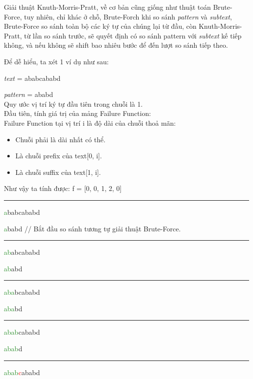 \documentclass[a4paper,11pt]{article}
\begin{document}
			Giải thuật Knuth-Morris-Pratt, về cơ bản cũng giống như thuật toán Brute-Force, 
			tuy nhiên, chỉ khác ở chỗ, Brute-Forch khi so sánh \textit{pattern} và \textit{subtext}, Brute-Force so sánh toàn bộ 
			các ký tự của chúng lại từ đầu, còn Knuth-Morris-Pratt, từ lần so sánh trước, sẽ quyết định có so sánh pattern với \textit{subtext} kế tiếp không, 
			và nếu không sẽ shift bao nhiêu bước để đến lượt so sánh tiếp theo.

			Để dễ hiểu, ta xét 1 ví dụ như sau: 
			
			\textit{text} \hspace*{6mm}= ababcababd

			\textit{pattern} \hspace*{0.3mm}= ababd\\
			Quy ước vị trí ký tự đầu tiên trong chuỗi là 1.\\
			Đầu tiên, tính giá trị của mảng Failure Function:\\
			Failure Function tại vị trí i là độ dài của chuỗi thoả mãn:
			\begin{itemize}
				\item Chuỗi phải là dài nhất có thể.
				\item Là chuỗi prefix của text[0, i].
				\item Là chuỗi suffix của text[1, i].
			\end{itemize}
			Như vậy ta tính được: 
			f = [0, 0, 1, 2, 0]
			
			\vspace*{4mm}
			\hrule
			\textcolor{ForestGreen}{a}babcababd
			
			\textcolor{ForestGreen}{a}babd \hspace*{1.8cm} // Bắt đầu so sánh tương tự giải thuật Brute-Force.

			\vspace*{2mm}
			\hrule
			\textcolor{ForestGreen}{ab}abcababd
			
			\textcolor{ForestGreen}{ab}abd
			
			\vspace*{2mm}
			\hrule
			\textcolor{ForestGreen}{aba}bcababd
			
			\textcolor{ForestGreen}{aba}bd

			\vspace*{2mm}
			\hrule
			\textcolor{ForestGreen}{abab}cababd
			
			\textcolor{ForestGreen}{abab}d

			\vspace*{2mm}
			\hrule
			\textcolor{ForestGreen}{abab}\textcolor{red}{c}ababd
			
\end{document}
